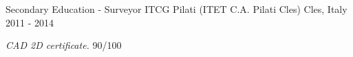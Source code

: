 \begin{cventries}
 \cventry
   {Secondary Education - Surveyor} %
   {ITCG Pilati (ITET C.A. Pilati Cles)} %
   {Cles, Italy} %
   {2011 - 2014} %
   {
     \begin{cvitems} %
       \item {\textit{CAD 2D certificate.}  90/100}
     \end{cvitems}
   }

\end{cventries}
